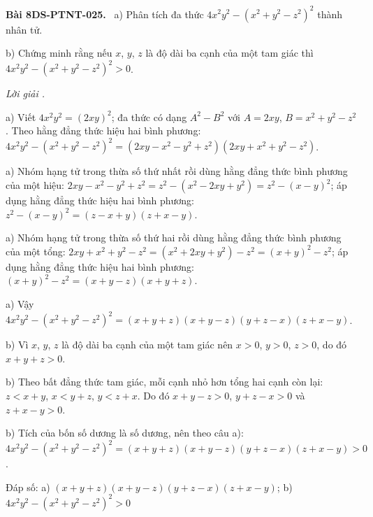 \documentclass[12pt,a4paper]{article}
\newenvironment{problem}[1][]{\par\medskip\noindent\textbf{Bài #1.}\ }{\par}
\newenvironment{solution}[1][]{\par\noindent\textit{Lời giải #1.}\par}{\par}
\begin{document}
\begin{problem}[8DS-PTNT-025]
a) Phân tích đa thức $4x^2y^2 - (x^2 + y^2 - z^2)^2$ thành nhân tử.

b) Chứng minh rằng nếu $x$, $y$, $z$ là độ dài ba cạnh của một tam giác thì $4x^2y^2 - (x^2 + y^2 - z^2)^2 > 0$.

\begin{solution}
a) Viết $4x^2y^2 = (2xy)^2$; đa thức có dạng $A^2 - B^2$ với $A = 2xy$, $B = x^2 + y^2 - z^2$. Theo hằng đẳng thức hiệu hai bình phương: $4x^2y^2 - (x^2 + y^2 - z^2)^2 = (2xy - x^2 - y^2 + z^2)(2xy + x^2 + y^2 - z^2)$.

a) Nhóm hạng tử trong thừa số thứ nhất rồi dùng hằng đẳng thức bình phương của một hiệu: $2xy - x^2 - y^2 + z^2 = z^2 - (x^2 - 2xy + y^2) = z^2 - (x - y)^2$; áp dụng hằng đẳng thức hiệu hai bình phương: $z^2 - (x - y)^2 = (z - x + y)(z + x - y)$.

a) Nhóm hạng tử trong thừa số thứ hai rồi dùng hằng đẳng thức bình phương của một tổng: $2xy + x^2 + y^2 - z^2 = (x^2 + 2xy + y^2) - z^2 = (x + y)^2 - z^2$; áp dụng hằng đẳng thức hiệu hai bình phương: $(x + y)^2 - z^2 = (x + y - z)(x + y + z)$.

a) Vậy $4x^2y^2 - (x^2 + y^2 - z^2)^2 = (x + y + z)(x + y - z)(y + z - x)(z + x - y)$.

b) Vì $x$, $y$, $z$ là độ dài ba cạnh của một tam giác nên $x > 0$, $y > 0$, $z > 0$, do đó $x + y + z > 0$.

b) Theo bất đẳng thức tam giác, mỗi cạnh nhỏ hơn tổng hai cạnh còn lại: $z < x + y$, $x < y + z$, $y < z + x$. Do đó $x + y - z > 0$, $y + z - x > 0$ và $z + x - y > 0$.

b) Tích của bốn số dương là số dương, nên theo câu a): $4x^2y^2 - (x^2 + y^2 - z^2)^2 = (x + y + z)(x + y - z)(y + z - x)(z + x - y) > 0$.

Đáp số: a) $\boxed{(x + y + z)(x + y - z)(y + z - x)(z + x - y)}$; b) $\boxed{4x^2y^2 - (x^2 + y^2 - z^2)^2 > 0}$
\end{solution}
\end{problem}
\end{document}

